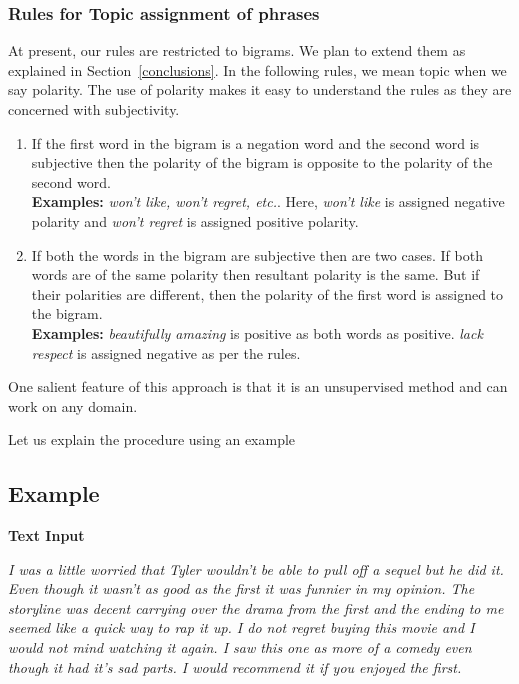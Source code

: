 \subsubsection*{Rules for Topic assignment of phrases}

At present, our rules are restricted to bigrams. We plan to extend them as explained in Section~\cref{conclusions}. In the following rules, we mean topic when we say 
polarity. The use of polarity makes it easy to understand the rules as they are concerned with subjectivity.

\begin{enumerate}
 \item If the first word in the bigram is a negation word and the second word is subjective then the polarity of the bigram is opposite to the polarity of the second word. \\
 \textbf{Examples:} \textit{won't like, won't regret, etc.}. Here, \textit{won't like} is assigned negative polarity and \textit{won't regret} is assigned positive polarity.
 \item If both the words in the bigram are subjective then are two cases. If both words are of the same polarity then resultant polarity is the same. But if their polarities
 are different, then the polarity of the first word is assigned to the bigram. \\
 \textbf{Examples:} \textit{beautifully amazing} is positive as both words as positive. \textit{lack respect} is assigned negative as per the rules.
\end{enumerate}

One salient feature of this approach is that it is an unsupervised method and can work on any domain. 

Let us explain the procedure using an example

\subsection{Example}

\textbf{Text Input}

\textit{I was a little worried that Tyler wouldn't be able to pull off a sequel but he did it.  Even though it wasn't as good as the first it was funnier in my opinion.  
The storyline was decent carrying over the drama from the first and the ending to me seemed like a quick way to rap it up.  I do not regret buying this movie and I would 
not mind watching it again.  I saw this one as more of a comedy even though it had it's sad parts.  I would recommend it if you enjoyed the first.
}

